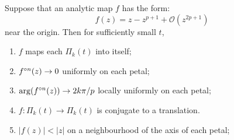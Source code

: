 \begin{theorem}
Suppose that an analytic map \( f \) has the form:\[
	f(z)=z-z^{p+1}+\mathcal{O}(z^{2p+1})
\] near the origin. Then for sufficiently small \( t \),
\begin{enumerate}
	\item \( f \) maps each \( \Pi_k(t) \) into itself;
	\item \( \fof[n](z)\to 0 \) uniformly on each petal;
	\item \( \arg(\fof[n](z))\to 2k\pi /p \) locally uniformly on each petal;
	\item \( f:\Pi_k(t)\to \Pi_k(t) \) is conjugate to a translation.
	\item \( |f(z)|<|z| \) on a neighbourhood of the axis of each petal;
\end{enumerate}
\end{theorem}

